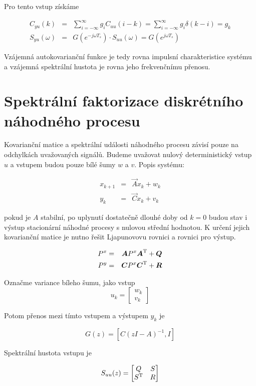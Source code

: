 Pro tento vstup získáme

\begin{eqnarray*}
C_{yu}(k) & = & \sum_{i=-\infty}^\infty g_iC_{uu}(i-k) = \sum_{i=-\infty}^\infty g_i\delta(k-i)=g_k\\
S_{yu}(\omega) & = & G\left(e^{-j\omega T_s}\right)\cdot S_{uu}(\omega) = G\left(e^{j\omega T_s}\right)
\end{eqnarray*}

Vzájemná autokovarianční funkce je tedy rovna impulsní charakteristice systému a vzájemná spektrální hustota je rovna jeho frekvenčnímu přenosu.

\section{Spektrální faktorizace diskrétního náhodného procesu}

Kovarianční matice a spektrální události náhodného procesu závisí pouze na odchylkách uvažovaných signálů. Budeme uvažovat nulový deterministický vstup $u$ a vstupem budou pouze bílé šumy $w$ a $v$. Popis systému:

\begin{eqnarray*}
x_{k+1} & = & \vec{A}x_k + w_k\\
y_k & = & \vec{C}x_k + v_k
\end{eqnarray*}

pokud je $A$ stabilní, po uplynutí dostatečně dlouhé doby od $k=0$ budou stav i výstup stacionární náhodné procesy s nulovou střední hodnotou. K určení jejich kovarianční matice je nutno řešit Ljapunovovu rovnici a rovnici pro výstup.

\begin{eqnarray*}
P^x & = & \boldsymbol{A}P^x\boldsymbol{A}^{\mathrm{T}} + \boldsymbol{Q}\\
P^y & = & \boldsymbol{C}P^x\boldsymbol{C}^{\mathrm{T}} + \boldsymbol{R}
\end{eqnarray*}

Označme variance bíleho šumu, jako vstup
\[ u_k =
\begin{bmatrix}
w_k\\v_k
\end{bmatrix}
\]

Potom přenos mezi tímto vstupem a výstupem $y_k$ je

\[ G(z) = [C(zI-A)^{-1}, I] \]

Spektrální hustota vstupu je

\[ S_{uu}(z) =
\begin{bmatrix}
Q & S\\
S^{\mathrm{T}} & R
\end{bmatrix}
\]

